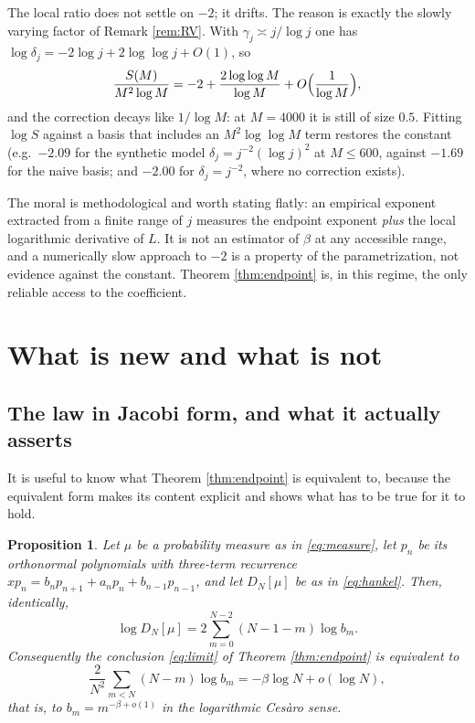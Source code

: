 \documentclass[11pt]{amsart}
\numberwithin{equation}{section}
\theoremstyle{plain}
\newtheorem{proposition}[theorem]{Proposition}
\theoremstyle{definition}
\theoremstyle{remark}
\begin{document}
The local ratio does not settle on $-2$; it drifts. The reason is exactly the slowly varying factor
of Remark \ref{rem:RV}. With $\gamma_{j}\asymp j/\log j$ one has
$\log\delta_{j}=-2\log j+2\log\log j+O(1)$, so
\[
\frac{S(M)}{M^{2}\log M}=-2+\frac{2\log\log M}{\log M}+O\Bigl(\frac1{\log M}\Bigr),
\]
and the correction decays like $1/\log M$: at $M=4000$ it is still of size $0.5$. Fitting
$\log S$ against a basis that includes an $M^{2}\log\log M$ term restores the constant
(e.g.\ $-2.09$ for the synthetic model $\delta_{j}=j^{-2}(\log j)^{2}$ at $M\le600$, against
$-1.69$ for the naive basis; and $-2.00$ for $\delta_{j}=j^{-2}$, where no correction exists).

The moral is methodological and worth stating flatly: an empirical exponent extracted from a
finite range of $j$ measures the endpoint exponent \emph{plus} the local logarithmic derivative of
$L$. It is not an estimator of $\beta$ at any accessible range, and a numerically slow approach to
$-2$ is a property of the parametrization, not evidence against the constant. Theorem
\ref{thm:endpoint} is, in this regime, the only reliable access to the coefficient.

\section{What is new and what is not}
\label{sec:position}

\subsection{The law in Jacobi form, and what it actually asserts}
\label{ss:jacobi}

It is useful to know what Theorem \ref{thm:endpoint} is equivalent to, because the equivalent form
makes its content explicit and shows what has to be true for it to hold.

\begin{proposition}
\label{prop:jacobi}
Let $\mu$ be a probability measure as in \eqref{eq:measure}, let $p_{n}$ be its orthonormal
polynomials with three-term recurrence $xp_{n}=b_{n}p_{n+1}+a_{n}p_{n}+b_{n-1}p_{n-1}$, and let
$D_{N}[\mu]$ be as in \eqref{eq:hankel}. Then, identically,
\begin{equation}
\log D_{N}[\mu]=2\sum_{m=0}^{N-2}(N-1-m)\log b_{m}.
\label{eq:jacobi_identity}
\end{equation}
Consequently the conclusion \eqref{eq:limit} of Theorem \ref{thm:endpoint} is equivalent to
\begin{equation}
\frac{2}{N^{2}}\sum_{m<N}(N-m)\log b_{m}=-\beta\log N+o(\log N),
\label{eq:jacobi_equivalent}
\end{equation}
that is, to $b_{m}=m^{-\beta+o(1)}$ in the logarithmic Ces\`aro sense.
\end{proposition}
\end{document}
